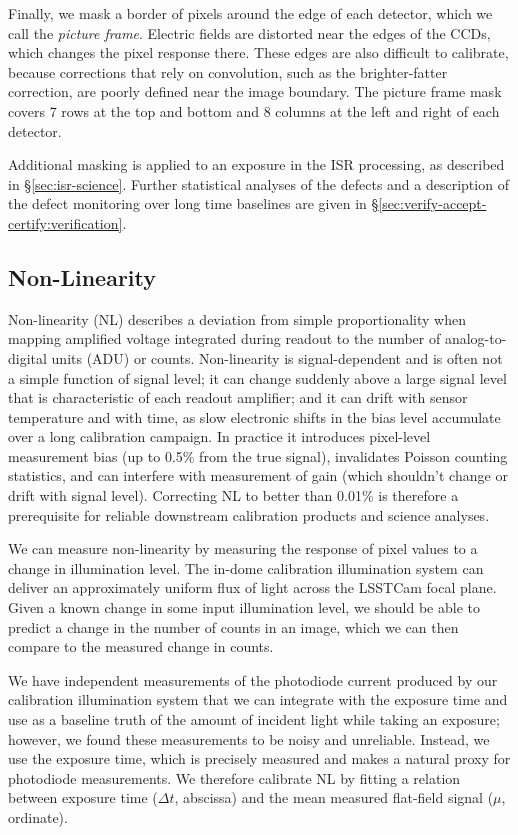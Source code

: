Finally, we mask a border of pixels around the edge of each detector, which we call the \textit{picture frame}.
Electric fields are distorted near the edges of the CCDs, which changes the pixel response there.
These edges are also difficult to calibrate, because corrections that rely on convolution, such as the brighter-fatter correction, are poorly defined near the image boundary.
The picture frame mask covers 7 rows at the top and bottom and 8 columns at the left and right of each detector.

Additional masking is applied to an exposure in the ISR processing, as described in \S\ref{sec:isr-science}.
Further statistical analyses of the defects and a description of the defect monitoring over long time baselines are given in \S\ref{sec:verify-accept-certify:verification}.

\subsection{Non-Linearity} \label{sec:calibration-production:linearity}

Non-linearity (NL) describes a deviation from simple proportionality when mapping amplified voltage integrated during readout to the number of analog-to-digital units (ADU) or counts.
Non-linearity is signal-dependent and is often not a simple function of signal level; it can change suddenly above a large signal level that is characteristic of each readout amplifier; and it can drift with sensor temperature and with time, as slow electronic shifts in the bias level accumulate over a long calibration campaign.
In practice it introduces pixel-level measurement bias (up to 0.5\% from the true signal), invalidates Poisson counting statistics, and can interfere with measurement of gain (which shouldn't change or drift with signal level).
Correcting NL to better than 0.01\% is therefore a prerequisite for reliable downstream calibration products and science analyses.

We can measure non-linearity by measuring the response of pixel values to a change in illumination level.
The in-dome calibration illumination system can deliver an approximately uniform flux of light across the LSSTCam focal plane.
Given a known change in some input illumination level, we should be able to predict a change in the number of counts in an image, which we can then compare to the measured change in counts.

We have independent measurements of the photodiode current produced by our calibration illumination system that we can integrate with the exposure time and use as a baseline truth of the amount of incident light while taking an exposure;
however, we found these measurements to be noisy and unreliable. Instead, we use the exposure time, which is precisely measured and makes a natural proxy for photodiode measurements.
We therefore calibrate NL by fitting a relation between exposure time ($\Delta t$, abscissa) and the mean measured flat-field signal ($\mu$, ordinate).

